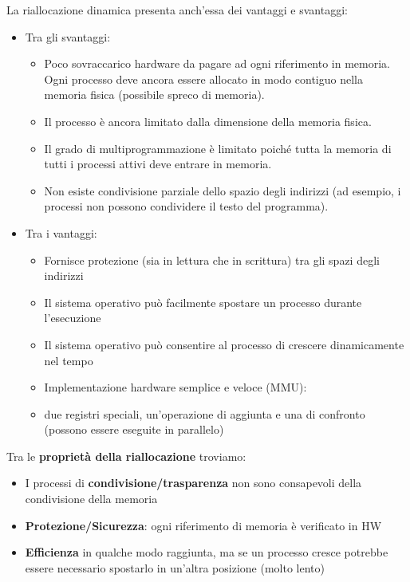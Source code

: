 \documentclass{article}
\begin{document}
La riallocazione dinamica presenta anch'essa dei vantaggi e svantaggi:
\begin{itemize}
    \item Tra gli svantaggi:
    \begin{itemize}
        \item Poco sovraccarico hardware da pagare ad ogni riferimento in memoria. Ogni processo deve ancora essere allocato in modo contiguo nella memoria fisica (possibile spreco di memoria).
        \item Il processo è ancora limitato dalla dimensione della memoria fisica.
        \item Il grado di multiprogrammazione è limitato poiché tutta la memoria di tutti i processi attivi deve entrare in memoria.
        \item Non esiste condivisione parziale dello spazio degli indirizzi (ad esempio, i processi non possono condividere il testo del programma).
    \end{itemize}
    \item Tra i vantaggi:
    \begin{itemize}
        \item Fornisce protezione (sia in lettura che in scrittura) tra gli spazi degli indirizzi 
        \item Il sistema operativo può facilmente spostare un processo durante l'esecuzione
        \item Il sistema operativo può consentire al processo di crescere dinamicamente nel tempo
        \item Implementazione hardware semplice e veloce (MMU):
        \item due registri speciali, un'operazione di aggiunta e una di confronto (possono essere eseguite in parallelo)
    \end{itemize}
\end{itemize}
Tra le \textbf{proprietà della riallocazione} troviamo:
\begin{itemize}
    \item I processi di \textbf{condivisione/trasparenza} non sono consapevoli della condivisione della memoria
    \item \textbf{Protezione/Sicurezza}: ogni riferimento di memoria è verificato in HW
    \item \textbf{Efficienza} in qualche modo raggiunta, ma se un processo cresce potrebbe essere necessario spostarlo in un'altra posizione (molto lento)
\end{itemize}
\pagebreak
\end{document}

